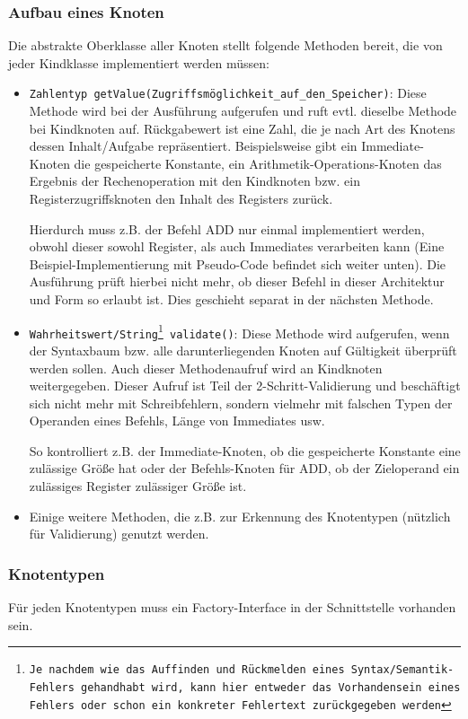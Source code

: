 \subsubsection{Aufbau eines Knoten}
Die abstrakte Oberklasse aller Knoten stellt folgende Methoden bereit, die von jeder Kindklasse implementiert werden müssen:
\begin{itemize}
	\item \texttt{Zahlentyp getValue(Zugriffsmöglichkeit\_auf\_den\_Speicher)}: Diese Methode wird bei der Ausführung aufgerufen und ruft evtl. dieselbe Methode bei Kindknoten auf. Rückgabewert ist eine Zahl, die je nach Art des Knotens dessen Inhalt/Aufgabe repräsentiert. Beispielsweise gibt ein Immediate-Knoten die gespeicherte Konstante, ein Arithmetik-Operations-Knoten das Ergebnis der Rechenoperation mit den Kindknoten bzw. ein Registerzugriffsknoten den Inhalt des Registers zurück.

	Hierdurch muss z.B. der Befehl ADD nur einmal implementiert werden, obwohl dieser sowohl Register, als auch Immediates verarbeiten kann (Eine Beispiel-Implementierung mit Pseudo-Code befindet sich weiter unten). Die Ausführung prüft hierbei nicht mehr, ob dieser Befehl in dieser Architektur und Form so erlaubt ist. Dies geschieht separat in der nächsten Methode.

	\item \texttt{Wahrheitswert/String\footnote{Je nachdem wie das Auffinden und Rückmelden eines Syntax/Semantik-Fehlers gehandhabt wird, kann hier entweder das Vorhandensein eines Fehlers oder schon ein konkreter Fehlertext zurückgegeben werden} validate()}: Diese Methode wird aufgerufen, wenn der Syntaxbaum bzw. alle darunterliegenden Knoten auf Gültigkeit überprüft werden sollen. Auch dieser Methodenaufruf wird an Kindknoten weitergegeben. Dieser Aufruf ist Teil der 2-Schritt-Validierung und beschäftigt sich nicht mehr mit Schreibfehlern, sondern vielmehr mit falschen Typen der Operanden eines Befehls, Länge von Immediates usw.

	So kontrolliert z.B. der Immediate-Knoten, ob die gespeicherte Konstante eine zulässige Größe hat oder der Befehls-Knoten für ADD, ob der Zieloperand ein zulässiges Register zulässiger Größe ist.

	\item Einige weitere Methoden, die z.B. zur Erkennung des Knotentypen (nützlich für Validierung) genutzt werden.
\end{itemize}
\subsubsection{Knotentypen}
Für jeden Knotentypen muss ein Factory-Interface in der Schnittstelle vorhanden sein.

